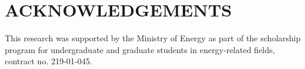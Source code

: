 \documentclass[letterpaper]{mc2021}
\begin{document}

\section*{ACKNOWLEDGEMENTS}

This research was supported by the Ministry of Energy as part of the scholarship program for undergraduate and graduate students in energy-related fields, contract no. 219-01-045.

\newif\ifusebibtex
\usebibtextrue

\ifusebibtex
\setlength{\baselineskip}{12pt}


\else
\setlength{\baselineskip}{12pt}
\begin{thebibliography}{300}
\bibitem{journal} B. Author(s), ``Title,'' \emph{Journal Name in Italic}, 
  \textbf{Volume in Bold}, pp. 34-89 (19xx).
\bibitem{proc_paper} C. D. Author(s), ``Article Title,'' \emph{Proceedings of
  Meeting in Italic}, Location, Dates of Meeting, Vol. n, pp. 134-156 
  (19xx).
\bibitem{book} E. F. Author, \emph{Book Title in Italic}, Publisher, City \&
  Country (19xx). 
\bibitem{website} ``Spallation Neutron Source: The next-generation 
  neutron-scattering facility in the United States,'' 
  \url{http://www.sns.gov/documentation/sns\_brochure.pdf} (2002).
\end{thebibliography}
\fi

\end{document}
